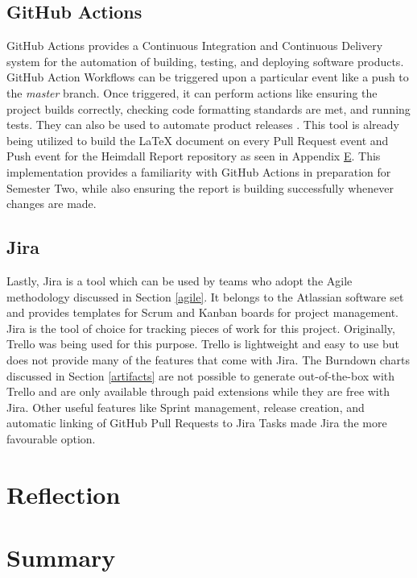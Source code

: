 \documentclass{article}
\begin{document}
\subsection{GitHub Actions} \label{gha}

GitHub Actions provides a Continuous Integration and Continuous Delivery system for the automation of building, testing, and deploying software products. GitHub Action Workflows can be triggered upon a particular event like a push to the \emph{master} branch. Once triggered, it can perform actions like ensuring the project builds correctly, checking code formatting standards are met, and running tests. They can also be used to automate product releases \cite{github-actions}. This tool is already being utilized to build the LaTeX document on every Pull Request event and Push event for the Heimdall Report repository as seen in Appendix \hyperlink{appendix-e}{E}. This implementation provides a familiarity with GitHub Actions in preparation for Semester Two, while also ensuring the report is building successfully whenever changes are made.



\subsection{Jira}

Lastly, Jira is a tool which can be used by teams who adopt the Agile methodology discussed in Section \ref{agile}. It belongs to the Atlassian software set and provides templates for Scrum and Kanban boards for project management. Jira is the tool of choice for tracking pieces of work for this project. Originally, Trello was being used for this purpose. Trello is lightweight and easy to use but does not provide many of the features that come with Jira. The Burndown charts discussed in Section \ref{artifacts} are not possible to generate out-of-the-box with Trello and are only available through paid extensions while they are free with Jira. Other useful features like Sprint management, release creation, and automatic linking of GitHub Pull Requests to Jira Tasks made Jira the more favourable option.






\section{Reflection}



\section{Summary}
\end{document}
